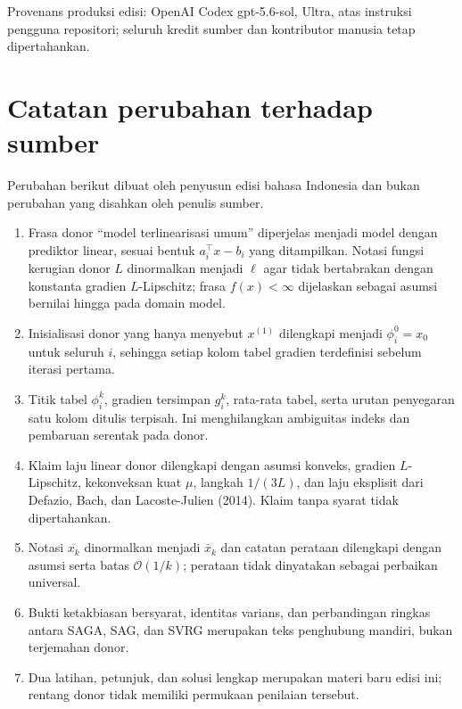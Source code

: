 \documentclass[indonesian]{shinybook}
\begin{document}
Provenans produksi edisi: OpenAI Codex gpt-5.6-sol, Ultra, atas instruksi
pengguna repositori; seluruh kredit sumber dan kontributor manusia tetap
dipertahankan.

\tableofcontents
\mainmatter


\backmatter
\chapter*{Catatan perubahan terhadap sumber}
Perubahan berikut dibuat oleh penyusun edisi bahasa Indonesia dan bukan
perubahan yang disahkan oleh penulis sumber.
\begingroup\small
\begin{enumerate}
  \setlength{\itemsep}{0.15em}
  \setlength{\parskip}{0pt}
  \item Frasa donor ``model terlinearisasi umum'' diperjelas menjadi model
    dengan prediktor linear, sesuai bentuk $a_i^\top x-b_i$ yang ditampilkan.
    Notasi fungsi kerugian donor $L$ dinormalkan menjadi $\ell$ agar tidak
    bertabrakan dengan konstanta gradien $L$-Lipschitz; frasa $f(x)<\infty$
    dijelaskan sebagai asumsi bernilai hingga pada domain model.
  \item Inisialisasi donor yang hanya menyebut $x^{(1)}$ dilengkapi menjadi
    $\phi_i^0=x_0$ untuk seluruh $i$, sehingga setiap kolom tabel gradien
    terdefinisi sebelum iterasi pertama.
  \item Titik tabel $\phi_i^k$, gradien tersimpan $g_i^k$, rata-rata tabel,
    serta urutan penyegaran satu kolom ditulis terpisah. Ini menghilangkan
    ambiguitas indeks dan pembaruan serentak pada donor.
  \item Klaim laju linear donor dilengkapi dengan asumsi konveks, gradien
    $L$-Lipschitz, kekonveksan kuat $\mu$, langkah $1/(3L)$, dan laju eksplisit
    dari Defazio, Bach, dan Lacoste-Julien (2014). Klaim tanpa syarat tidak
    dipertahankan.
  \item Notasi $\overline{x_k}$ dinormalkan menjadi $\bar x_k$ dan catatan
    perataan dilengkapi dengan asumsi serta batas $\mathcal O(1/k)$; perataan
    tidak dinyatakan sebagai perbaikan universal.
  \item Bukti ketakbiasan bersyarat, identitas varians, dan perbandingan ringkas
    antara SAGA, SAG, dan SVRG merupakan teks penghubung mandiri, bukan
    terjemahan donor.
  \item Dua latihan, petunjuk, dan solusi lengkap merupakan materi baru edisi
    ini; rentang donor tidak memiliki permukaan penilaian tersebut.
\end{enumerate}
\endgroup
\end{document}
